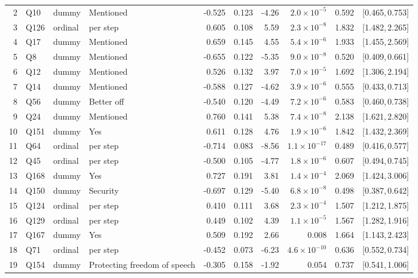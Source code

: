 \begin{landscape}
\begin{longtable}{r l l l r r r r r c}
2 & Q10 & dummy & Mentioned & -0.525 & 0.123 & -4.26 & $2.0{\times}10^{-5}$ & 0.592 & [0.465,\,0.753] &  \\
3 & Q126 & ordinal & per step & 0.605 & 0.108 & 5.59 & $2.3{\times}10^{-8}$ & 1.832 & [1.482,\,2.265] &  \\
4 & Q17 & dummy & Mentioned & 0.659 & 0.145 & 4.55 & $5.4{\times}10^{-6}$ & 1.933 & [1.455,\,2.569] &  \\
5 & Q8 & dummy & Mentioned & -0.655 & 0.122 & -5.35 & $9.0{\times}10^{-8}$ & 0.520 & [0.409,\,0.661] &  \\
6 & Q12 & dummy & Mentioned & 0.526 & 0.132 & 3.97 & $7.0{\times}10^{-5}$ & 1.692 & [1.306,\,2.194] &  \\
7 & Q14 & dummy & Mentioned & -0.588 & 0.127 & -4.62 & $3.9{\times}10^{-6}$ & 0.555 & [0.433,\,0.713] &  \\
8 & Q56 & dummy & Better off & -0.540 & 0.120 & -4.49 & $7.2{\times}10^{-6}$ & 0.583 & [0.460,\,0.738] &  \\
9 & Q24 & dummy & Mentioned & 0.760 & 0.141 & 5.38 & $7.4{\times}10^{-8}$ & 2.138 & [1.621,\,2.820] &  \\
10 & Q151 & dummy & Yes & 0.611 & 0.128 & 4.76 & $1.9{\times}10^{-6}$ & 1.842 & [1.432,\,2.369] &  \\
11 & Q64 & ordinal & per step & -0.714 & 0.083 & -8.56 & $1.1{\times}10^{-17}$ & 0.489 & [0.416,\,0.577] &  \\
12 & Q45 & ordinal & per step & -0.500 & 0.105 & -4.77 & $1.8{\times}10^{-6}$ & 0.607 & [0.494,\,0.745] &  \\
13 & Q168 & dummy & Yes & 0.727 & 0.191 & 3.81 & $1.4{\times}10^{-4}$ & 2.069 & [1.424,\,3.006] &  \\
14 & Q150 & dummy & Security & -0.697 & 0.129 & -5.40 & $6.8{\times}10^{-8}$ & 0.498 & [0.387,\,0.642] &  \\
15 & Q124 & ordinal & per step & 0.410 & 0.111 & 3.68 & $2.3{\times}10^{-4}$ & 1.507 & [1.212,\,1.875] &  \\
16 & Q129 & ordinal & per step & 0.449 & 0.102 & 4.39 & $1.1{\times}10^{-5}$ & 1.567 & [1.282,\,1.916] &  \\
17 & Q167 & dummy & Yes & 0.509 & 0.192 & 2.66 & 0.008 & 1.664 & [1.143,\,2.423] &  \\
18 & Q71 & ordinal & per step & -0.452 & 0.073 & -6.23 & $4.6{\times}10^{-10}$ & 0.636 & [0.552,\,0.734] &  \\
\rowcolor{gray!12} 19 & Q154 & dummy & Protecting freedom of speech & -0.305 & 0.158 & -1.92 & 0.054 & 0.737 & [0.541,\,1.006] &  \\

\end{longtable}
\end{landscape}
